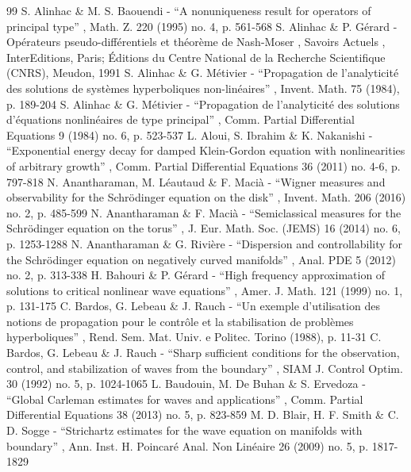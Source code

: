 \documentclass[11pt]{article}
\theoremstyle{definition}
\begin{document}

\begin{thebibliography}{99}
 S. Alinhac \& M. S. Baouendi - “A nonuniqueness result for operators of principal type” , Math. Z. 220 (1995) no. 4, p. 561-568
 S. Alinhac \& P. Gérard - Opérateurs pseudo-différentiels et théorème de Nash-Moser , Savoirs Actuels , InterEditions, Paris; Éditions du Centre National de la Recherche Scientifique (CNRS), Meudon, 1991
 S. Alinhac \& G. Métivier - “Propagation de l’analyticité des solutions de systèmes hyperboliques non-linéaires” , Invent. Math. 75 (1984), p. 189-204
 S. Alinhac \& G. Métivier - “Propagation de l’analyticité des solutions d’équations nonlinéaires de type principal” , Comm. Partial Differential Equations 9 (1984) no. 6, p. 523-537
 L. Aloui, S. Ibrahim \& K. Nakanishi - “Exponential energy decay for damped Klein-Gordon equation with nonlinearities of arbitrary growth” , Comm. Partial Differential Equations 36 (2011) no. 4-6, p. 797-818
 N. Anantharaman, M. Léautaud \& F. Macià - “Wigner measures and observability for the Schrödinger equation on the disk” , Invent. Math. 206 (2016) no. 2, p. 485-599
 N. Anantharaman \& F. Macià - “Semiclassical measures for the Schrödinger equation on the torus” , J. Eur. Math. Soc. (JEMS) 16 (2014) no. 6, p. 1253-1288
 N. Anantharaman \& G. Rivière - “Dispersion and controllability for the Schrödinger equation on negatively curved manifolds” , Anal. PDE 5 (2012) no. 2, p. 313-338
 H. Bahouri \& P. Gérard - “High frequency approximation of solutions to critical nonlinear wave equations” , Amer. J. Math. 121 (1999) no. 1, p. 131-175
 C. Bardos, G. Lebeau \& J. Rauch - “Un exemple d’utilisation des notions de propagation pour le contrôle et la stabilisation de problèmes hyperboliques” , Rend. Sem. Mat. Univ. e Politec. Torino (1988), p. 11-31
 C. Bardos, G. Lebeau \& J. Rauch - “Sharp sufficient conditions for the observation, control, and stabilization of waves from the boundary” , SIAM J. Control Optim. 30 (1992) no. 5, p. 1024-1065
 L. Baudouin, M. De Buhan \& S. Ervedoza - “Global Carleman estimates for waves and applications” , Comm. Partial Differential Equations 38 (2013) no. 5, p. 823-859
 M. D. Blair, H. F. Smith \& C. D. Sogge - “Strichartz estimates for the wave equation on manifolds with boundary” , Ann. Inst. H. Poincaré Anal. Non Linéaire 26 (2009) no. 5, p. 1817-1829

\end{thebibliography}
\end{document}
